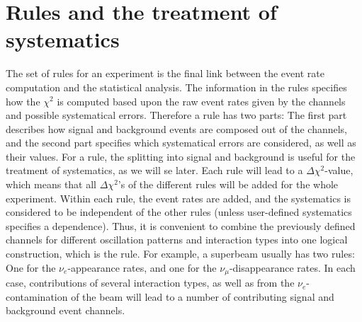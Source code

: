 \section{Rules and the treatment of systematics}
\label{sec:rules}

The set of rules for an experiment is the final 
link between the event rate computation and the statistical analysis. 
The information in the rules
specifies how the $\chi^2$ is computed based upon the raw event rates 
given by the channels and possible systematical errors. 
Therefore a rule has two parts: The first part describes how signal and 
background events are composed out of the channels, and the second part
specifies which systematical errors are considered, as well as their values.
%
For a rule, the splitting
into signal and background is useful for the treatment of systematics, as we will se later. Each rule will lead to a $\Delta \chi^2$-value,
which means that all $\Delta \chi^2$'s of the different rules will be added
for the whole experiment. Within each rule, the event rates are added, and
the systematics is considered to be independent of the other rules (unless user-defined
systematics specifies a dependence).
Thus, it is convenient to combine the previously defined channels for different
oscillation patterns and interaction types into one logical construction,
which is the rule. For example, a superbeam usually has two rules: One for
the $\nu_e$-appearance rates, and one for the $\nu_\mu$-disappearance rates.
 In each case, contributions of several interaction types, as well as from
 the $\nu_e$-contamination of the beam will lead to a number of contributing signal and background event channels.

